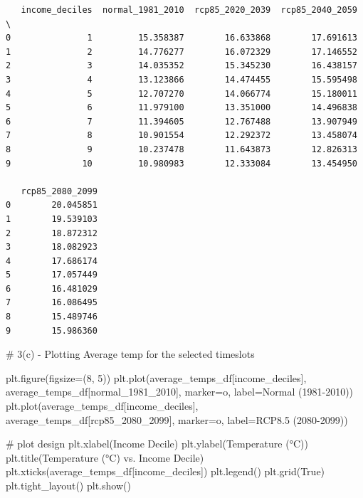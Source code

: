 \documentclass[
  letterpaper,
  DIV=11,
  numbers=noendperiod]{scrartcl}
\newenvironment{Shaded}{\begin{snugshade}}{\end{snugshade}}
\newcommand{\CommentTok}[1]{\textcolor[rgb]{0.37,0.37,0.37}{#1}}
\newcommand{\DecValTok}[1]{\textcolor[rgb]{0.68,0.00,0.00}{#1}}
\newcommand{\NormalTok}[1]{\textcolor[rgb]{0.00,0.23,0.31}{#1}}
\newcommand{\OperatorTok}[1]{\textcolor[rgb]{0.37,0.37,0.37}{#1}}
\newcommand{\StringTok}[1]{\textcolor[rgb]{0.13,0.47,0.30}{#1}}
\newcommand{\VariableTok}[1]{\textcolor[rgb]{0.07,0.07,0.07}{#1}}
\begin{document}
\begin{verbatim}
   income_deciles  normal_1981_2010  rcp85_2020_2039  rcp85_2040_2059  \
0               1         15.358387        16.633868        17.691613   
1               2         14.776277        16.072329        17.146552   
2               3         14.035352        15.345230        16.438157   
3               4         13.123866        14.474455        15.595498   
4               5         12.707270        14.066774        15.180011   
5               6         11.979100        13.351000        14.496838   
6               7         11.394605        12.767488        13.907949   
7               8         10.901554        12.292372        13.458074   
8               9         10.237478        11.643873        12.826313   
9              10         10.980983        12.333084        13.454950   

   rcp85_2080_2099  
0        20.045851  
1        19.539103  
2        18.872312  
3        18.082923  
4        17.686174  
5        17.057449  
6        16.481029  
7        16.086495  
8        15.489746  
9        15.986360  
\end{verbatim}

\begin{Shaded}
\begin{Highlighting}[]
\CommentTok{\# 3(c) {-} Plotting Average temp for the selected timeslots}

\NormalTok{plt.figure(figsize}\OperatorTok{=}\NormalTok{(}\DecValTok{8}\NormalTok{, }\DecValTok{5}\NormalTok{))}
\NormalTok{plt.plot(average\_temps\_df[}\StringTok{\textquotesingle{}income\_deciles\textquotesingle{}}\NormalTok{], average\_temps\_df[}\StringTok{\textquotesingle{}normal\_1981\_2010\textquotesingle{}}\NormalTok{], marker}\OperatorTok{=}\StringTok{\textquotesingle{}o\textquotesingle{}}\NormalTok{, label}\OperatorTok{=}\StringTok{\textquotesingle{}Normal (1981{-}2010)\textquotesingle{}}\NormalTok{)}
\NormalTok{plt.plot(average\_temps\_df[}\StringTok{\textquotesingle{}income\_deciles\textquotesingle{}}\NormalTok{], average\_temps\_df[}\StringTok{\textquotesingle{}rcp85\_2080\_2099\textquotesingle{}}\NormalTok{], marker}\OperatorTok{=}\StringTok{\textquotesingle{}o\textquotesingle{}}\NormalTok{, label}\OperatorTok{=}\StringTok{\textquotesingle{}RCP8.5 (2080{-}2099)\textquotesingle{}}\NormalTok{)}

\CommentTok{\# plot design}
\NormalTok{plt.xlabel(}\StringTok{\textquotesingle{}Income Decile\textquotesingle{}}\NormalTok{)}
\NormalTok{plt.ylabel(}\StringTok{\textquotesingle{}Temperature (°C)\textquotesingle{}}\NormalTok{)}
\NormalTok{plt.title(}\StringTok{\textquotesingle{}Temperature (°C) vs. Income Decile\textquotesingle{}}\NormalTok{)}
\NormalTok{plt.xticks(average\_temps\_df[}\StringTok{\textquotesingle{}income\_deciles\textquotesingle{}}\NormalTok{]) }
\NormalTok{plt.legend()}
\NormalTok{plt.grid(}\VariableTok{True}\NormalTok{)}
\NormalTok{plt.tight\_layout()}
\NormalTok{plt.show()}
\end{Highlighting}
\end{Shaded}
\end{document}
